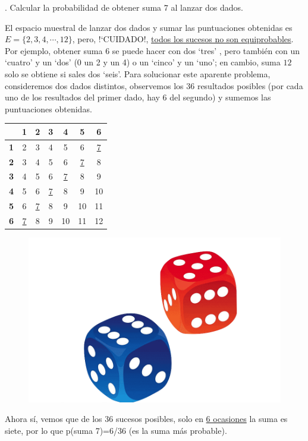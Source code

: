\begin{example}
.	Calcular la probabilidad de obtener suma $7$ al lanzar dos dados.

\vspace{2mm} El espacio muestral de lanzar dos dados y sumar las puntuaciones obtenidas es $E=\{ 2,3,4,\cdots, 12 \}$, pero, !`CUIDADO!, \underline{todos los sucesos no son equiprobables}. Por ejemplo, obtener suma $6$ se puede hacer con dos `tres'	, pero también con un `cuatro' y un `dos' (0 un 2 y un 4) o un `cinco' y un `uno'; en cambio, suma $12$ solo se obtiene si sales dos `seis'. Para solucionar este aparente problema, consideremos dos dados distintos, observemos los $36$ resultados posibles (por cada uno de los resultados del primer dado, hay $6$ del segundo) y sumemos las puntuaciones obtenidas.

\begin{multicols}{2}
\begin{table}[H]
\small
\centering
\begin{tabular}{c|c|c|c|c|c|c|}
 & {\color[HTML]{FE0000} \textbf{1}} & {\color[HTML]{FE0000} \textbf{2}} & {\color[HTML]{FE0000} \textbf{3}} & {\color[HTML]{FE0000} \textbf{4}} & {\color[HTML]{FE0000} \textbf{5}} & {\color[HTML]{FE0000} \textbf{6}} \\ \hline
{\color[HTML]{3531FF} \textbf{1}} & 2 & 3 & 4 & 5 & 6 & \underline{7} \\ \hline
{\color[HTML]{3531FF} \textbf{2}} & 3 & 4 & 5 & 6 & \underline{7} & 8 \\ \hline
{\color[HTML]{3531FF} \textbf{3}} & 4 & 5 & 6 & \underline{7} & 8 & 9 \\ \hline
{\color[HTML]{3531FF} \textbf{4}} & 5 & 6 & \underline{7} & 8 & 9 & 10 \\ \hline
{\color[HTML]{3531FF} \textbf{5}} & 6 & \underline{7} & 8 & 9 & 10 & 11 \\ \hline
{\color[HTML]{3531FF} \textbf{6}} & \underline{7} & 8 & 9 & 10 & 11 & 12 \\ \cline{2-7} 
\end{tabular}
\end{table}
	\begin{figure}[H]
			\centering
			\includegraphics[width=.4\textwidth]{imagenes/imagenes02/T02IM15.png}
	\end{figure}
\end{multicols}
Ahora sí, vemos que de los 36 sucesos posibles, solo en \underline{6 ocasiones} la suma es siete, por lo que p(suma 7)=6/36 (es la suma más probable).	
\end{example}

